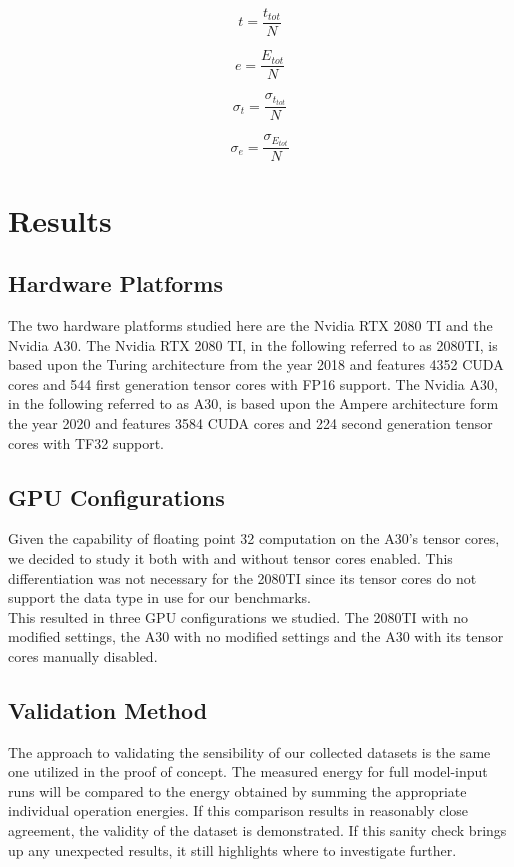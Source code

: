 \documentclass[conference]{IEEEtran}
\begin{document}
\begin{equation}
t = \frac{t_{tot}}{N}
\end{equation}

\begin{equation}
e = \frac{E_{tot}}{N}
\end{equation}

\begin{equation}
\sigma_t = \frac{\sigma_{t_{tot}}}{N}
\end{equation}

\begin{equation}
\sigma_e = \frac{\sigma_{E_{tot}}}{N}
\end{equation}

\section{Results}

\subsection{Hardware Platforms}
The two hardware platforms studied here are the Nvidia RTX 2080 TI and the Nvidia A30. The Nvidia RTX 2080 TI, in the following referred to as 2080TI, is based upon the Turing architecture from the year 2018 and features 4352 CUDA cores and 544 first generation tensor cores with FP16 support. The Nvidia A30, in the following referred to as A30, is based upon the Ampere architecture form the year 2020 and features 3584 CUDA cores and 224 second generation tensor cores with TF32 support.\\

\subsection{GPU Configurations}
Given the capability of floating point 32 computation on the A30's tensor cores, we decided to study it both with and without tensor cores enabled. This differentiation was not necessary for the 2080TI since its tensor cores do not support the data type in use for our benchmarks. \\
This resulted in three GPU configurations we studied. The 2080TI with no modified settings, the A30 with no modified settings and the A30 with its tensor cores manually disabled.

\subsection{Validation Method}
The approach to validating the sensibility of our collected datasets is the same one utilized in the proof of concept. The measured energy for full model-input runs will be compared to the energy obtained by summing the appropriate individual operation energies. If this comparison results in reasonably close agreement, the validity of the dataset is demonstrated. If this sanity check brings up any unexpected results, it still highlights where to investigate further.
\end{document}
